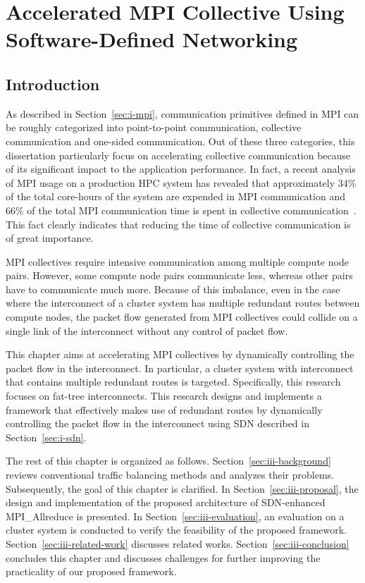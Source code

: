 \chapter{Accelerated MPI Collective Using Software-Defined Networking}\label{sec:iii}

\section{Introduction}\label{sec:iii-introduction}

As described in Section~\ref{sec:i-mpi}, communication primitives defined in
MPI can be roughly categorized into point-to-point communication, collective
communication and one-sided communication. Out of these three categories, this
dissertation particularly focus on accelerating collective communication
because of its significant impact to the application performance. In fact, a
recent analysis of MPI usage on a production HPC system has revealed that
approximately 34\% of the total core-hours of the system are expended in MPI
communication and 66\% of the total MPI communication time is spent in
collective communication~\autocite{Chunduri2018}. This fact clearly indicates
that reducing the time of collective communication is of great importance.

MPI collectives require intensive communication among multiple compute node
pairs. However, some compute node pairs communicate less, whereas other pairs
have to communicate much more. Because of this imbalance, even in the case
where the interconnect of a cluster system has multiple redundant routes
between compute nodes, the packet flow generated from MPI collectives could
collide on a single link of the interconnect without any control of packet
flow.

This chapter aims at accelerating MPI collectives by dynamically
controlling the packet flow in the interconnect. In particular, a
cluster system with interconnect that contains multiple redundant routes is
targeted. Specifically, this research focuses on fat-tree interconnects. This
research designs and implements a framework that effectively makes use of
redundant routes by dynamically controlling the packet flow in the
interconnect using SDN described in Section~\ref{sec:i-sdn}.

The rest of this chapter is organized as follows.
Section~\ref{sec:iii-background} reviews conventional traffic balancing
methods and analyzes their problems. Subsequently, the goal of this chapter is
clarified. In Section~\ref{sec:iii-proposal}, the design and implementation of
the proposed architecture of SDN-enhanced MPI\_Allreduce is presented. In
Section~\ref{sec:iii-evaluation}, an evaluation on a cluster system is
conducted to verify the feasibility of the proposed framework.
Section~\ref{sec:iii-related-work} discusses related works.
Section~\ref{sec:iii-conclusion} concludes this chapter and discusses
challenges for further improving the practicality of our proposed framework.

